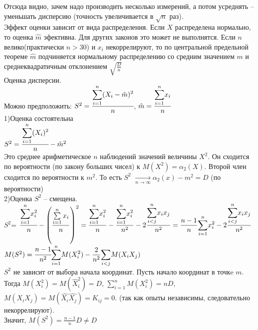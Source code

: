 \documentclass[russian, 12pt, fleqn]{article}
\begin{document}
Отсюда видно, зачем надо производить несколько измерений, а потом усреднять -- уменьшать дисперсию (точность увеличивается  в $\sqrt{n}$ раз).\\
Эффект оценки зависит от вида распределения. Если $X$ распределена нормально, то оценка $\hat{m}$ эфективна.  Для других законов это может не выполнятся. Если $n$
велико(практически $n>30$) и $x_i$ некоррелируют, то по центральной предельной теореме $\hat{m}$ подчиняется нормальному распределению со средним значением $m$ и среднеквадратичным отклонением $\sqrt{\frac{D}{n}}$\\
Оценка дисперсии.\\
Можно предположить: $ S^2 = \cfrac{ \displaystyle{\sum \limits_{i = 1}^{n}} (X_i - \hat{m})^2 }{\normalsize  n}$, $\hat{m} = \cfrac{ \displaystyle{\sum \limits_{i = 1}^{n}} x_i}{n}$\\
1)Оценка состоятельна\\
$S^2=\cfrac{ \displaystyle{\sum \limits_{i = 1}^{n}} (X_i)^2 }{n}- \hat{m}^2$\\
Это среднее  арифметическое $n$ наблюдений значений величины $X^2$. Он сходится по вероятности (по закону больших чисел) к $M(X^2) = \alpha_2(X)$. Второй член сходится по вероятности к $m^2$. То есть $S^2$ $\displaystyle{\underset{n \rightarrow \infty}{\rightarrow}} \alpha_2(x) - m^2 = D$ (по вероятности)\\
2)Оценка $S^2$ -- смещена.\\
$S^2$= $\cfrac{ \displaystyle{\sum \limits_{i = 1}^{n}}x_i^2 }{n} -  \displaystyle{ \left ( \frac{\sum \limits_{i = 1}^{n}x_i }{n} \right )^2 } = \frac{ \displaystyle{\sum \limits_{i = 1}^{n}}x_i^2 }{n}  - \frac{ \displaystyle{\sum \limits_{i = 1}^{n}}x_i^2 }{n^2} - 2 \frac{ \displaystyle{\sum \limits_{i < j}^{n}}x_ix_j }{n^2}  = \frac{n - 1}{n} \displaystyle{\sum \limits_{i = 1}^{n}}x_i^2  - 2 \frac{ \displaystyle{\sum \limits_{i < j}^{n}}x_ix_j }{n^2}  $  \\
$M(S^2) = \cfrac{n - 1}{n^2}  \displaystyle{\sum \limits_{i = 1}^{n}}M(X_i^2) - \frac{2}{n^2}  \displaystyle{\sum \limits_{i < j}^{}} M(X_iX_j)$\\
$S^2$ не зависит от выбора начала координат. Пусть начало координат в точкe $m$. Тогда $M(X_i^2) = M(\hat{X}_i^2) =D$, $ \displaystyle{\sum \limits _{i=1} ^ {n}} M(X_i^2) = nD$, $M(X_iX_j) = M(\hat{X_i}\hat{X_j}) = K_{ij} = 0$. (так как опыты независимы, следовательно некоррелируют).\\
Значит, $M(S^2) = \frac{n - 1}{n} D \neq D$\\
\end{document}
